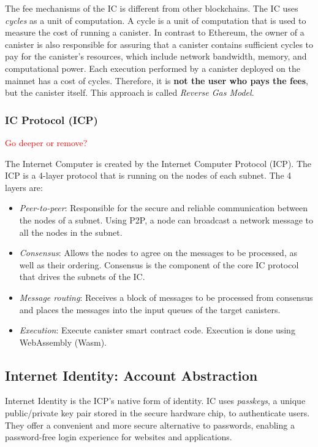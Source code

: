 The fee mechanisms of the IC is different from other blockchains. The IC uses \textit{cycles} as a unit of computation. A cycle is a unit of computation that is used to measure the cost of running a canister. In contrast to Ethereum, the owner of a canister is also responsible for assuring that a canister contains sufficient cycles to pay for the canister's resources, which include network bandwidth, memory, and computational power. Each execution performed by a canister deployed on the mainnet has a cost of cycles. Therefore, it is \textbf{not the user who pays the fees}, but the canister itself. \cite{icp-developer-journey} This approach is called \textit{Reverse Gas Model}. \cite{icp-reverse-gas-model}

\subsubsection{IC Protocol (ICP)}

\textcolor{red}{Go deeper or remove?}

The Internet Computer is created by the Internet Computer Protocol (ICP). The ICP is a 4-layer protocol that is running on the nodes of each subnet. The 4 layers are: \cite{icp-how-it-works}

\begin{itemize}
    \item \textit{Peer-to-peer}: Responsible for the secure and reliable communication between the nodes of a subnet. Using P2P, a node can broadcast a network message to all the nodes in the subnet.
    \item \textit{Consensus}: Allows the nodes to agree on the messages to be processed, as well as their ordering. Consensus is the component of the core IC protocol that drives the subnets of the IC.
    \item \textit{Message routing}: Receives a block of messages to be processed from consensus and places the messages into the input queues of the target canisters.
    \item \textit{Execution}: Execute canister smart contract code. Execution is done using WebAssembly (Wasm). 
\end{itemize}


\subsection{Internet Identity: Account Abstraction}

Internet Identity is the ICP's native form of identity. IC uses \textit{passkeys}, a unique public/private key pair stored in the secure hardware chip, to authenticate users. They offer a convenient and more secure alternative to passwords, enabling a password-free login experience for websites and applications. \cite{icp-identity}

